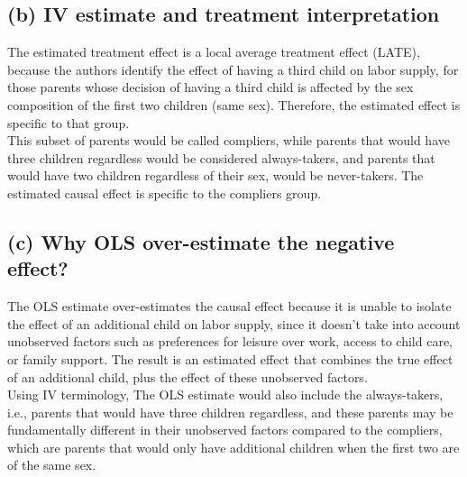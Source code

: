 \documentclass{scrartcl}
\begin{document}
\subsection*{(b) IV estimate and treatment interpretation}


The estimated treatment effect is a local average treatment effect (LATE), because the authors identify the effect of having a third child on labor supply, for those parents whose decision of having a third child is affected by the sex composition of the first two children (same sex). Therefore, the estimated effect is specific to that group. \\

This subset of parents would be called compliers, while parents that would have three children regardless would be considered always-takers, and parents that would have two children regardless of their sex, would be never-takers. The estimated causal effect is specific to the compliers group.

\subsection*{(c) Why OLS over-estimate the negative effect?}


The OLS estimate over-estimates the causal effect because it is unable to isolate the effect of an additional child on labor supply, since it doesn't take into account unobserved factors such as preferences for leisure over work, access to child care, or family support. The result is an estimated effect that combines the true effect of an additional child, plus the effect of these unobserved factors. \\

Using IV terminology, The OLS estimate would also include the always-takers, i.e., parents that would have three children regardless, and these parents may be fundamentally different in their unobserved factors compared to the compliers, which are parents that would only have additional children when the first two are of the same sex.
\end{document}
